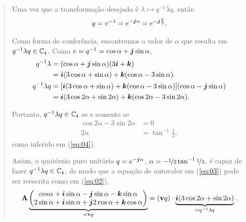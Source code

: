 \begin{quotation}
\begin{example}
	Uma vez que a transforma\c c\~ao desejada \'e $ \lambda \mapsto q^{-1} \lambda q $, ent\~ao
	\begin{equation}
	q = v^{-1} = e^{- \boldsymbol{j} \alpha} = e^{- \boldsymbol{j} \frac{\theta}{2}}.
	\end{equation}
	
	
	Como forma de confer\^encia, encontremos o valor de $ \alpha $ que resulta em $ q^{-1} \lambda q \in \mathbb{C}_{\boldsymbol{i}} $. Como $ v = q^{-1} = \cos \alpha + \boldsymbol{j} \sin \alpha $,
	\begin{equation}
	\begin{aligned}
	q^{-1} \lambda &= (\cos \alpha + \boldsymbol{j} \sin \alpha)(3 \boldsymbol{i} + \boldsymbol{k})\\
	&= \boldsymbol{i}(3 \cos \alpha + \sin \alpha) + \boldsymbol{k}(\cos \alpha - 3 \sin \alpha). \\
	q^{-1} \lambda q &= [\boldsymbol{i}(3 \cos \alpha + \sin \alpha) + \boldsymbol{k}(\cos \alpha - 3 \sin \alpha)] (\cos \alpha - \boldsymbol{j} \sin \alpha) \\
	&= \boldsymbol{i} (3 \cos 2\alpha + \sin 2\alpha) + \boldsymbol{k}(\cos 2\alpha - 3 \sin 2\alpha).
	\end{aligned}
	\end{equation}
	
	Portanto, $ q^{-1} \lambda q \in \mathbb{C}_{\boldsymbol{i}} $ se e somente se
	\begin{equation}
	\begin{aligned}\textbf{}
	\cos 2\alpha - 3 \sin 2\alpha &= 0 \\
	2\alpha &= \tan^{-1} \frac{1}{3},
	\end{aligned}
	\end{equation}
	como inferido em (\ref{eq:04}).
	
Assim, o quat\'ernio puro unit\'ario $ q = e^{- \boldsymbol{j} \alpha} $, $ \alpha = - \displaystyle \nicefrac{1}{2} \tan^{-1} \nicefrac{1}{3} $, \'e capaz de fazer $ q^{-1} \lambda q \in \mathbb{C}_{\boldsymbol{i}}$, de modo que a equa\c c\~ao de autovalor em (\ref{eq:03}) pode ser reescrita como em (\ref{eq:02}),
	\begin{equation}
	\mathbf{A} \underbrace{\begin{pmatrix}
		cos \alpha + \boldsymbol{i} \sin \alpha - \boldsymbol{j} \sin \alpha - \boldsymbol{k} \sin \alpha \\
		2 \sin \alpha + \boldsymbol{i} \sin \alpha + \boldsymbol{j} 2 \cos \alpha + \boldsymbol{k} \cos \alpha
		\end{pmatrix}}_{= \mathbf{v} q} =
	(\mathbf{v} q) \cdot \underbrace{\boldsymbol{i} (3 \cos 2\alpha + \sin 2\alpha)}_{= q^{-1} \lambda q}.
	\end{equation}
\end{example}
\end{quotation}

